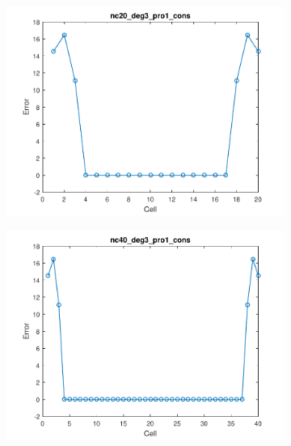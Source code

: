 \documentclass[11pt,a4paper]{article}
\theoremstyle{plain}
\theoremstyle{definition}
\begin{document}
\begin{figure}[H]
\begin{subfigure}[b]{0.48\textwidth}
\includegraphics[width=\linewidth]{../../tests_01_01/test_01_01_test9_pro1_cons/output/plots/nc20_deg3_wei111_pro1_cons.pdf}
\end{subfigure}\hspace*{\fill}
\begin{subfigure}[b]{0.48\textwidth}
\includegraphics[width=\linewidth]{../../tests_01_01/test_01_01_test9_pro1_cons/output/plots/nc40_deg3_wei111_pro1_cons.pdf}
\end{subfigure}


\end{figure}
\end{document}
